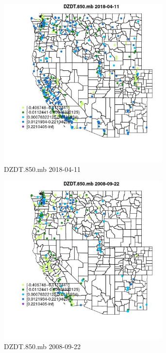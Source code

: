 \begin{figure} 
\centering  
\includegraphics[width=0.77\textwidth]{Code_Outputs/Report_ML_input_PM25_Step4_part_e_de_duplicated_aves_compiled_2019-05-18wNAs_MapObsDZDT850mb2018-04-11.jpg} 
\caption{\label{fig:Report_ML_input_PM25_Step4_part_e_de_duplicated_aves_compiled_2019-05-18wNAsMapObsDZDT850mb2018-04-11}DZDT.850.mb 2018-04-11} 
\end{figure} 
 

\begin{figure} 
\centering  
\includegraphics[width=0.77\textwidth]{Code_Outputs/Report_ML_input_PM25_Step4_part_e_de_duplicated_aves_compiled_2019-05-18wNAs_MapObsDZDT850mb2008-09-22.jpg} 
\caption{\label{fig:Report_ML_input_PM25_Step4_part_e_de_duplicated_aves_compiled_2019-05-18wNAsMapObsDZDT850mb2008-09-22}DZDT.850.mb 2008-09-22} 
\end{figure} 
 

